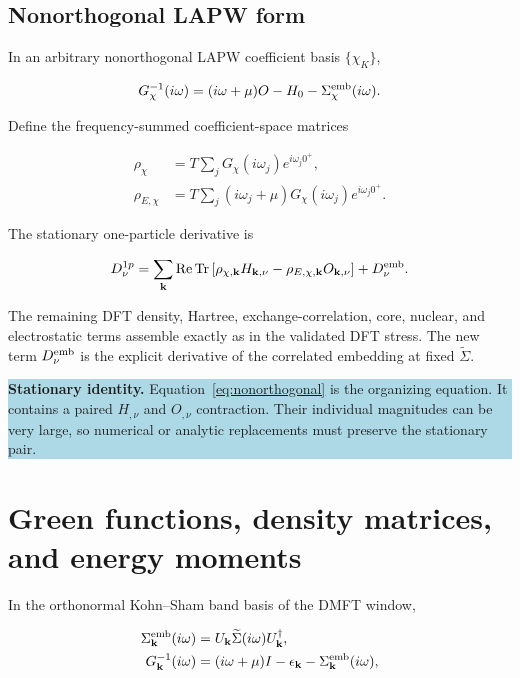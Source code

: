 \documentclass[11pt]{article}
\numberwithin{equation}{section}
\newcommand{\Tr}{\operatorname{Tr}}
\newcommand{\Ree}{\operatorname{Re}}
\newcommand{\kb}{\mathbf k}
\newcommand{\Sig}{\widetilde\Sigma}
\newcommand{\status}[2]{\par\medskip\noindent\colorbox{#1}{\parbox{0.965\linewidth}{#2}}\par\medskip}
\newcommand{\identitybox}[1]{\status{lightblue}{\textbf{Stationary identity.} #1}}
\begin{document}
\subsection{Nonorthogonal LAPW form}

In an arbitrary nonorthogonal LAPW coefficient basis $\{\chi_K\}$,

\begin{equation}
 G_\chi^{-1}(i\omega)
 =(i\omega+\mu)O-H_0-\Sigma_\chi^{\rm emb}(i\omega).
\end{equation}

Define the frequency-summed coefficient-space matrices

\begin{align}
 \rho_\chi &=T\sum_jG_\chi(i\omega_j)e^{i\omega_j0^+},\\
 \rho_{E,\chi}&=T\sum_j(i\omega_j+\mu)
 G_\chi(i\omega_j)e^{i\omega_j0^+}.
\end{align}

The stationary one-particle derivative is

\begin{equation}
 D_\nu^{1p}
 =\sum_{\kb}\Ree\Tr\left[
 \rho_{\chi,\kb}H_{\kb,\nu}
 -\rho_{E,\chi,\kb}O_{\kb,\nu}\right]
 +D_\nu^{\rm emb}.
 \label{eq:nonorthogonal}
\end{equation}

The remaining DFT density, Hartree, exchange-correlation, core, nuclear, and
electrostatic terms assemble exactly as in the validated DFT stress.  The new
term $D_\nu^{\rm emb}$ is the explicit derivative of the correlated embedding
at fixed $\Sig$.

\identitybox{Equation~\eqref{eq:nonorthogonal} is the organizing equation.
It contains a paired $H_{,\nu}$ and $O_{,\nu}$ contraction.  Their individual
magnitudes can be very large, so numerical or analytic replacements must
preserve the stationary pair.}

\section{Green functions, density matrices, and energy moments}

In the orthonormal Kohn--Sham band basis of the DMFT window,

\begin{align}
 \Sigma_{\kb}^{\rm emb}(i\omega)
 &=U_{\kb}\Sig(i\omega)U_{\kb}^\dagger,\\
 G_{\kb}^{-1}(i\omega)
 &=(i\omega+\mu)I-\epsilon_{\kb}
 -\Sigma_{\kb}^{\rm emb}(i\omega),
 \label{eq:dyson}
\end{align}
\end{document}

